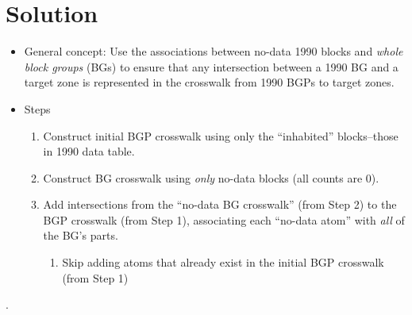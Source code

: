 \documentclass{article}
\begin{document}
\section{Solution}

\begin{itemize}
  \item General concept: Use the associations between no-data 1990 blocks and \textit{whole block groups} (BGs) to ensure that any intersection between a 1990 BG and a target zone is represented in the crosswalk from 1990 BGPs to target zones.
  \item Steps
  \begin{enumerate}
      \item Construct initial BGP crosswalk using only the ``inhabited'' blocks--those in 1990 data table.
      \item Construct BG crosswalk using \textit{only} no-data blocks (all counts are 0).
      \item Add intersections from the ``no-data BG crosswalk'' (from Step 2) to the BGP crosswalk (from Step 1), associating each ``no-data atom'' with \textit{all} of the BG's parts.
      \begin{enumerate}
        \item Skip adding atoms that already exist in the initial BGP crosswalk (from Step 1)
      \end{enumerate}
  \end{enumerate}
\end{itemize}.
\end{document}
